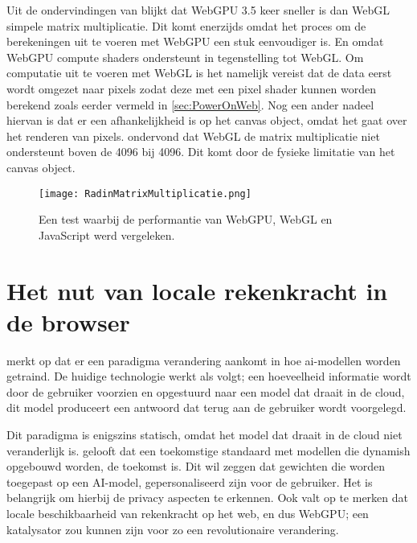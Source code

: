 Uit de ondervindingen van \textcite{Radin2021} blijkt dat WebGPU 3.5 keer sneller is dan WebGL simpele matrix multiplicatie. Dit komt enerzijds omdat het proces om de berekeningen uit te voeren met WebGPU een stuk eenvoudiger is. En omdat WebGPU compute shaders ondersteunt in tegenstelling tot WebGL. Om computatie uit te voeren met WebGL is het namelijk vereist dat de data eerst wordt omgezet naar pixels zodat deze met een pixel shader kunnen worden berekend zoals eerder vermeld in \ref{sec:PowerOnWeb}. Nog een ander nadeel hiervan is dat er een afhankelijkheid is op het canvas object, omdat het gaat over het renderen van pixels. \textcite{Radin2021} ondervond dat WebGL de matrix multiplicatie niet ondersteunt boven de 4096 bij 4096. Dit komt door de fysieke limitatie van het canvas object.

\begin{figure}
    \texttt{[image: RadinMatrixMultiplicatie.png]}
    \caption[Matrixvermenigvuldiging test \autocite{Radin2021}]{Een test waarbij de performantie van WebGPU, WebGL en JavaScript werd vergeleken.  \autocite{Radin2021}}
    \label{fig:Matrix Multiplication By Radin}
\end{figure}

\break{}

\section{Het nut van locale rekenkracht in de browser} %

\textcite{Fleetwood2022} merkt op dat er een paradigma verandering aankomt in hoe ai-modellen worden getraind. De huidige technologie werkt als volgt; een hoeveelheid informatie wordt door de gebruiker voorzien en opgestuurd naar een model dat draait in de cloud, dit model produceert een antwoord dat terug aan de gebruiker wordt voorgelegd.

\bigbreak{}

Dit paradigma is enigszins statisch, omdat het model dat draait in de cloud niet veranderlijk is. \textcite{Fleetwood2022} gelooft dat een toekomstige standaard met modellen die dynamish opgebouwd worden, de toekomst is. Dit wil zeggen dat gewichten die worden toegepast op een AI-model, gepersonaliseerd zijn voor de gebruiker. Het is belangrijk om hierbij de privacy aspecten te erkennen. Ook valt op te merken dat locale beschikbaarheid van rekenkracht op het web, en dus WebGPU; een katalysator zou kunnen zijn voor zo een revolutionaire verandering.


